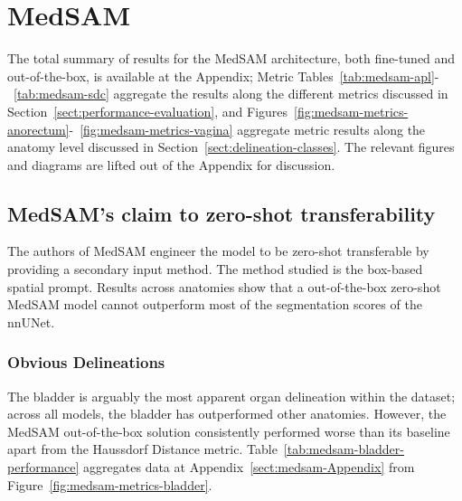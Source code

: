 \documentclass[11pt,twoside]{report}
\begin{document}
\clearpage

\section{MedSAM}

The total summary of results for the MedSAM architecture, both fine-tuned and out-of-the-box, is available at the Appendix; Metric Tables~\ref{tab:medsam-apl}-~\ref{tab:medsam-sdc} aggregate the results along the different metrics discussed in Section~\ref{sect:performance-evaluation}, and Figures~\ref{fig:medsam-metrics-anorectum}-~\ref{fig:medsam-metrics-vagina} aggregate metric results along the anatomy level discussed in Section~\ref{sect:delineation-classes}. The relevant figures and diagrams are lifted out of the Appendix for discussion.

\subsection{MedSAM's claim to zero-shot transferability}

The authors of MedSAM engineer the model to be zero-shot transferable by providing a secondary input method. The method studied is the box-based spatial prompt. Results across anatomies show that a out-of-the-box zero-shot MedSAM model cannot outperform most of the segmentation scores of the nnUNet.

\subsubsection{Obvious Delineations}\label{sec:medsam-ootb-obvious-delineations}

The bladder is arguably the most apparent organ delineation within the dataset; across all models, the bladder has outperformed other anatomies. However, the MedSAM out-of-the-box solution consistently performed worse than its baseline apart from the Haussdorf Distance metric. Table~\ref{tab:medsam-bladder-performance} aggregates data at Appendix~\ref{sect:medsam-Appendix} from Figure~\ref{fig:medsam-metrics-bladder}.
\end{document}
